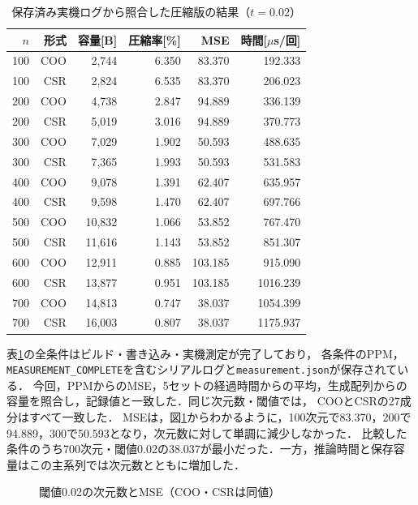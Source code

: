 \documentclass[a4paper,11pt]{article}
\newcommand{\code}[1]{\nolinkurl{#1}}
\begin{document}
\begin{table}[H]\centering\small
\caption{保存済み実機ログから照合した圧縮版の結果（$t=0.02$）}\label{tab:main}
\setlength{\tabcolsep}{5pt}
\begin{tabular}{rrrrrr}\toprule
$n$&形式&容量[B]&圧縮率[\%]&MSE&時間[$\mu$s/回]\\\midrule
100 & COO & 2,744 & 6.350 & 83.370 & 192.333\\\midrule
100 & CSR & 2,824 & 6.535 & 83.370 & 206.023\\\midrule
200 & COO & 4,738 & 2.847 & 94.889 & 336.139\\\midrule
200 & CSR & 5,019 & 3.016 & 94.889 & 370.773\\\midrule
300 & COO & 7,029 & 1.902 & 50.593 & 488.635\\\midrule
300 & CSR & 7,365 & 1.993 & 50.593 & 531.583\\\midrule
400 & COO & 9,078 & 1.391 & 62.407 & 635.957\\\midrule
400 & CSR & 9,598 & 1.470 & 62.407 & 697.766\\\midrule
500 & COO & 10,832 & 1.066 & 53.852 & 767.470\\\midrule
500 & CSR & 11,616 & 1.143 & 53.852 & 851.307\\\midrule
600 & COO & 12,911 & 0.885 & 103.185 & 915.090\\\midrule
600 & CSR & 13,877 & 0.951 & 103.185 & 1016.239\\\midrule
700 & COO & 14,813 & 0.747 & 38.037 & 1054.399\\\midrule
700 & CSR & 16,003 & 0.807 & 38.037 & 1175.937\\\midrule

\bottomrule\end{tabular}
\end{table}
表\ref{tab:main}の全条件はビルド・書き込み・実機測定が完了しており，
各条件のPPM，\code{MEASUREMENT_COMPLETE}を含むシリアルログと\code{measurement.json}が保存されている．
今回，PPMからのMSE，5セットの経過時間からの平均，生成配列からの容量を照合し，記録値と一致した．同じ次元数・閾値では，
COOとCSRの27成分はすべて一致した．
MSEは，図\ref{fig:mse-dimension}からわかるように，100次元で83.370，200で94.889，300で50.593となり，次元数に対して単調に減少しなかった．
比較した条件のうち700次元・閾値0.02の38.037が最小だった．一方，推論時間と保存容量はこの主系列では次元数とともに増加した．

\begin{figure}[H]\centering
{}
\caption{閾値0.02の次元数とMSE（COO・CSRは同値）}\label{fig:mse-dimension}
\end{figure}
\end{document}
